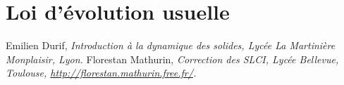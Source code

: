 \documentclass[10pt,fleqn]{article} %
\begin{document}
\section{Loi d'évolution usuelle}


\begin{thebibliography}{2}
    Emilien Durif, {\it Introduction à la dynamique des solides, Lycée La Martinière Monplaisir, Lyon.}
       Florestan Mathurin, {\it Correction des SLCI, Lycée Bellevue, Toulouse, \url{http://florestan.mathurin.free.fr/}.}



\end{thebibliography}
\end{document}

